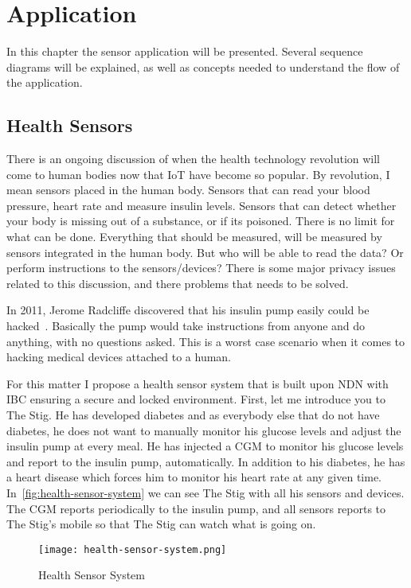 \chapter{Application}\label{sensor-application}
In this chapter the sensor application will be presented. 
Several sequence diagrams will be explained, as well as concepts needed to understand the flow of the application. 

\section{Health Sensors}
There is an ongoing discussion of when the health technology revolution will come to human bodies now that \gls{IoT} have become so popular.
By revolution, I mean sensors placed in the human body. 
Sensors that can read your blood pressure, heart rate and measure insulin levels.
Sensors that can detect whether your body is missing out of a substance, or if its poisoned. 
There is no limit for what can be done.
Everything that should be measured, will be measured by sensors integrated in the human body.
But who will be able to read the data?
Or perform instructions to the sensors/devices?
There is some major privacy issues related to this discussion, and there problems that needs to be solved.

In 2011, Jerome Radcliffe discovered that his insulin pump easily could be hacked~\cite{radcliffe2011hacking}.
Basically the pump would take instructions from anyone and do anything, with no questions asked. 
This is a worst case scenario when it comes to hacking medical devices attached to a human.

For this matter I propose a health sensor system that is built upon \gls{NDN} with \gls{IBC} ensuring a secure and locked environment.
First, let me introduce you to The Stig. 
He has developed diabetes and as everybody else that do not have diabetes, he does not want to manually monitor his glucose levels and adjust the insulin pump at every meal. 
He has injected a \gls{CGM} to monitor his glucose levels and report to the insulin pump, automatically.
In addition to his diabetes, he has a heart disease which forces him to monitor his heart rate at any given time. 
In~\autoref{fig:health-sensor-system} we can see The Stig with all his sensors and devices. 
The \gls{CGM} reports periodically to the insulin pump, and all sensors reports to The Stig's mobile so that The Stig can watch what is going on.

\begin{figure}[ht]
  \centering
  \texttt{[image: health-sensor-system.png]}
  \caption{Health Sensor System}
  \label{fig:health-sensor-system}
\end{figure}

